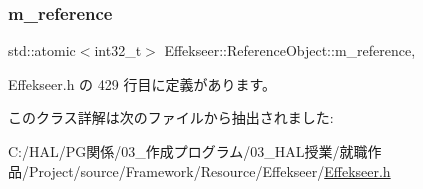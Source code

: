 \subsubsection{\texorpdfstring{m\+\_\+reference}{m\_reference}}
{\footnotesize\ttfamily std\+::atomic$<$int32\+\_\+t$>$ Effekseer\+::\+Reference\+Object\+::m\+\_\+reference\hspace{0.3cm}{\ttfamily [mutable]}, {\ttfamily [private]}}



 Effekseer.\+h の 429 行目に定義があります。



このクラス詳解は次のファイルから抽出されました\+:\begin{DoxyCompactItemize}
\item 
C\+:/\+H\+A\+L/\+P\+G関係/03\+\_\+作成プログラム/03\+\_\+\+H\+A\+L授業/就職作品/\+Project/source/\+Framework/\+Resource/\+Effekseer/\mbox{\hyperlink{_effekseer_8h}{Effekseer.\+h}}\end{DoxyCompactItemize}

